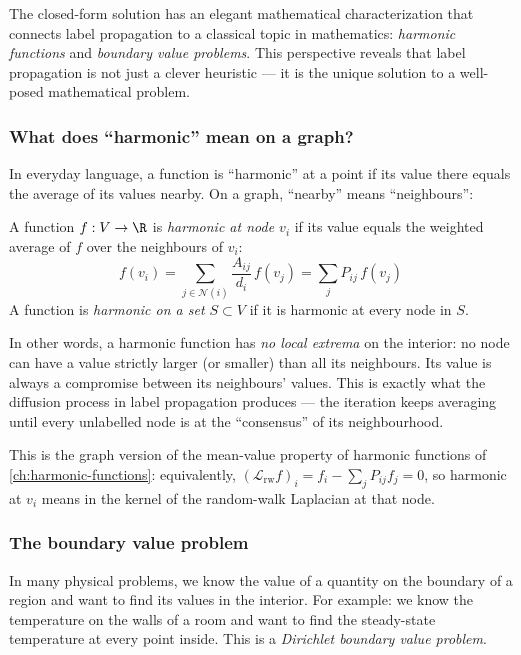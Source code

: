 \begin{notechapter}
The closed-form solution has an elegant mathematical characterization that
connects label propagation to a classical topic in mathematics:
\emph{harmonic functions} and \emph{boundary value problems}. This
perspective reveals that label propagation is not just a clever heuristic --- it
is the unique solution to a well-posed mathematical problem.

\subsubsection*{What does ``harmonic'' mean on a graph?}

In everyday language, a function is ``harmonic'' at a point if its value there
equals the average of its values nearby. On a graph, ``nearby'' means
``neighbours'':

\begin{definition}
\label{semi-supervised-graphs:def:harmonic}
A function $f: V \to \R$ is \emph{harmonic at node $v_i$} if its value
equals the weighted average of $f$ over the neighbours of $v_i$:
\begin{equation}
\label{semi-supervised-graphs:eq:harmonic_condition}
f(v_i) = \sum_{j \in \mathcal{N}(i)} \frac{A_{ij}}{d_i}\,f(v_j)
= \sum_j P_{ij}\,f(v_j)
\end{equation}
A function is \emph{harmonic on a set $S \subset V$} if it is harmonic at
every node in $S$.
\end{definition}

In other words, a harmonic function has \emph{no local extrema} on the
interior: no node can have a value strictly larger (or smaller) than all its
neighbours. Its value is always a compromise between its neighbours' values.
This is exactly what the diffusion process in label propagation produces --- the
iteration keeps averaging until every unlabelled node is at the ``consensus''
of its neighbourhood.

This is the graph version of the mean-value property of harmonic functions of \cref{ch:harmonic-functions}: equivalently, $(\mathcal L_{\mathrm{rw}}f)_i = f_i - \sum_jP_{ij}f_j = 0$, so harmonic at $v_i$ means in the kernel of the random-walk Laplacian at that node.

\subsubsection*{The boundary value problem}

In many physical problems, we know the value of a quantity on the boundary of
a region and want to find its values in the interior. For example: we know
the temperature on the walls of a room and want to find the steady-state
temperature at every point inside. This is a \emph{Dirichlet boundary value
problem}.


\end{notechapter}
